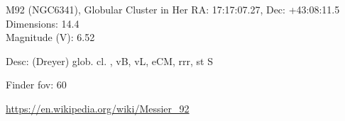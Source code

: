 \begin{block}{M92 (NGC6341), Globular Cluster in Her}
    RA: 17:17:07.27, Dec: +43:08:11.5 \\ 
    Dimensions: 14.4 \\ 
    Magnitude (V): 6.52


    Desc: (Dreyer) glob. cl. , vB, vL, eCM, rrr, st S 

    Finder fov: 60 

    \url{https://en.wikipedia.org/wiki/Messier_92} 
\end{block}